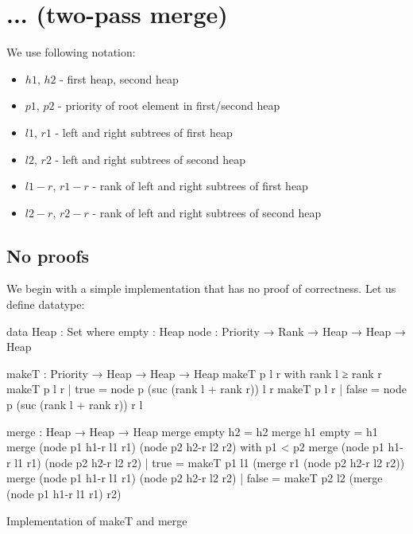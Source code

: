 \section{... (two-pass merge)}



We use following notation:

\begin{itemize}
 \item $h1$, $h2$ - first heap, second heap
 \item $p1$, $p2$ - priority of root element in first/second heap
 \item $l1$, $r1$ - left and right subtrees of first  heap
 \item $l2$, $r2$ - left and right subtrees of second heap
 \item $l1-r$, $r1-r$ - rank of left and right subtrees of first  heap
 \item $l2-r$, $r2-r$ - rank of left and right subtrees of second heap
\end{itemize}


\subsection{No proofs}

We begin with a simple implementation that has no proof of correctness. Let us define \Heap datatype:

\begin{code}
data Heap : Set where
  empty : Heap
  node  : Priority → Rank → Heap → Heap → Heap
\end{code}

\begin{listing}[b!]
\begin{code}
makeT : Priority → Heap → Heap → Heap
makeT p l r with rank l ≥ rank r
makeT p l r | true  = node p (suc (rank l + rank r)) l r
makeT p l r | false = node p (suc (rank l + rank r)) r l

merge : Heap → Heap → Heap
merge empty h2 = h2
merge h1 empty = h1
merge (node p1 h1-r l1 r1) (node p2 h2-r l2 r2)
  with p1 < p2
merge (node p1 h1-r l1 r1) (node p2 h2-r l2 r2)
  | true  = makeT p1 l1 (merge r1 (node p2 h2-r l2 r2))
merge (node p1 h1-r l1 r1) (node p2 h2-r l2 r2)
  | false = makeT p2 l2 (merge (node p1 h1-r l1 r1) r2)
\end{code}
\caption{Implementation of makeT and merge}\label{lst:makeT-merge}
\end{listing}

